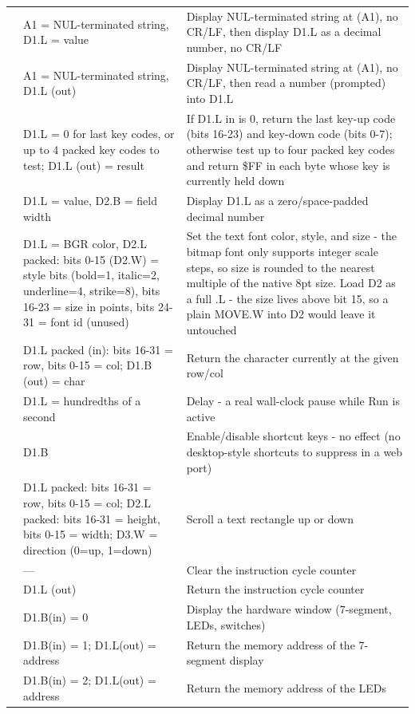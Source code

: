 \begin{longtable}{@{}p{1.7cm}p{5.2cm}p{7.3cm}@{}}
\ttfamily 17 & A1 = NUL-terminated string, D1.L = value & Display NUL-terminated string at (A1), no CR/LF, then display D1.L as a decimal number, no CR/LF \\
\ttfamily 18 & A1 = NUL-terminated string, D1.L (out) & Display NUL-terminated string at (A1), no CR/LF, then read a number (prompted) into D1.L \\
\ttfamily 19 & D1.L = 0 for last key codes, or up to 4 packed key codes to test; D1.L (out) = result & If D1.L in is 0, return the last key-up code (bits 16-23) and key-down code (bits 0-7); otherwise test up to four packed key codes and return \$FF in each byte whose key is currently held down \\
\ttfamily 20 & D1.L = value, D2.B = field width & Display D1.L as a zero/space-padded decimal number \\
\ttfamily 21 & D1.L = BGR color, D2.L packed: bits 0-15 (D2.W) = style bits (bold=1, italic=2, underline=4, strike=8), bits 16-23 = size in points, bits 24-31 = font id (unused) & Set the text font color, style, and size - the bitmap font only supports integer scale steps, so size is rounded to the nearest multiple of the native 8pt size. Load D2 as a full .L - the size lives above bit 15, so a plain MOVE.W into D2 would leave it untouched \\
\ttfamily 22 & D1.L packed (in): bits 16-31 = row, bits 0-15 = col; D1.B (out) = char & Return the character currently at the given row/col \\
\ttfamily 23 & D1.L = hundredths of a second & Delay - a real wall-clock pause while Run is active \\
\ttfamily 24 & D1.B & Enable/disable shortcut keys - no effect (no desktop-style shortcuts to suppress in a web port) \\
\ttfamily 25 & D1.L packed: bits 16-31 = row, bits 0-15 = col; D2.L packed: bits 16-31 = height, bits 0-15 = width; D3.W = direction (0=up, 1=down) & Scroll a text rectangle up or down \\
\ttfamily 30 & — & Clear the instruction cycle counter \\
\ttfamily 31 & D1.L (out) & Return the instruction cycle counter \\
\ttfamily 32.0 & D1.B(in) = 0 & Display the hardware window (7-segment, LEDs, switches) \\
\ttfamily 32.1 & D1.B(in) = 1; D1.L(out) = address & Return the memory address of the 7-segment display \\
\ttfamily 32.2 & D1.B(in) = 2; D1.L(out) = address & Return the memory address of the LEDs \\

\end{longtable}

